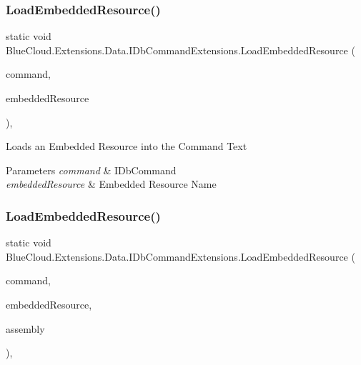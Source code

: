 \subsubsection{\texorpdfstring{Load\+Embedded\+Resource()}{LoadEmbeddedResource()}\hspace{0.1cm}{\footnotesize\ttfamily [1/2]}}
{\footnotesize\ttfamily static void Blue\+Cloud.\+Extensions.\+Data.\+I\+Db\+Command\+Extensions.\+Load\+Embedded\+Resource (\begin{DoxyParamCaption}\item[{this I\+Db\+Command}]{command,  }\item[{string}]{embedded\+Resource }\end{DoxyParamCaption})\hspace{0.3cm}{\ttfamily [inline]}, {\ttfamily [static]}}



Loads an Embedded Resource into the Command Text 


\begin{DoxyParams}{Parameters}
{\em command} & I\+Db\+Command\\
\hline
{\em embedded\+Resource} & Embedded Resource Name\\
\hline
\end{DoxyParams}
\mbox{\label{class_blue_cloud_1_1_extensions_1_1_data_1_1_i_db_command_extensions_aab4280488db21f8215f49ca35a1f8721}} 
\subsubsection{\texorpdfstring{Load\+Embedded\+Resource()}{LoadEmbeddedResource()}\hspace{0.1cm}{\footnotesize\ttfamily [2/2]}}
{\footnotesize\ttfamily static void Blue\+Cloud.\+Extensions.\+Data.\+I\+Db\+Command\+Extensions.\+Load\+Embedded\+Resource (\begin{DoxyParamCaption}\item[{this I\+Db\+Command}]{command,  }\item[{string}]{embedded\+Resource,  }\item[{System.\+Reflection.\+Assembly}]{assembly }\end{DoxyParamCaption})\hspace{0.3cm}{\ttfamily [inline]}, {\ttfamily [static]}}



